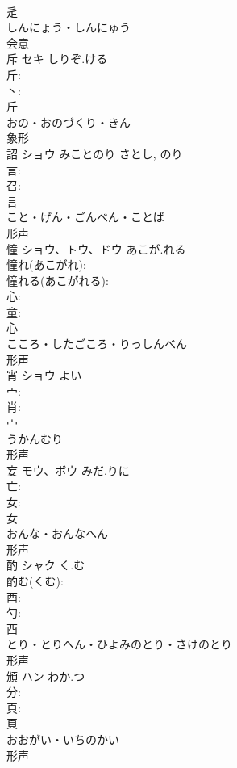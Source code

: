 \documentclass[8pt]{extreport}
\begin{document}
\begin{CJK}{UTF8}{min}
\\	辵	
\\	しんにょう・しんにゅう	
\\	会意 
\\	斥	セキ	しりぞ.ける		
\\	斤: 
\\	丶: 
\\	斤	
\\	おの・おのづくり・きん	
\\	象形 
\\	詔	ショウ	みことのり	さとし, のり	
\\	言: 
\\	召: 
\\	言	
\\	こと・げん・ごんべん・ことば	
\\	形声 
\\	憧	ショウ、トウ、ドウ	あこが.れる		
\\	憧れ(あこがれ): 
\\	憧れる(あこがれる): 
\\	心: 
\\	童: 
\\	心	
\\	こころ・したごころ・りっしんべん	
\\	形声 
\\	宵	ショウ	よい		
\\	宀: 
\\	肖: 
\\	宀	
\\	うかんむり	
\\	形声 
\\	妄	モウ、ボウ	みだ.りに		
\\	亡: 
\\	女: 
\\	女	
\\	おんな・おんなへん	
\\	形声 
\\	酌	シャク	く.む		
\\	酌む(くむ): 
\\	酉: 
\\	勺: 
\\	酉	
\\	とり・とりへん・ひよみのとり・さけのとり	
\\	形声 
\\	頒	ハン	わか.つ		
\\	分: 
\\	頁: 
\\	頁	
\\	おおがい・いちのかい	
\\	形声 

\end{CJK}
\end{document}
